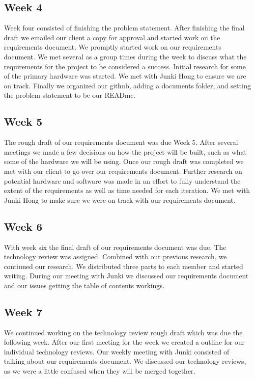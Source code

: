 \documentclass[onecolumn, draftclsnofoot,10pt, compsoc]{IEEEtran}
\begin{document}
		\subsection{Week 4}
		Week four consisted of finishing the problem statement. After finishing the final draft we emailed our client a copy for approval and started work on the requirements document.
		We promptly started work on our requirements document. We met several as a group times during the week to discuss what the requirements for the project  to be considered a success.
		Initial research for some of the primary hardware was started. We met with Junki Hong to ensure we are on track.
		Finally we organized our github, adding a documents folder, and setting the problem statement to be our READme.

		\subsection{Week 5}
		The rough draft of our requirements document was due Week 5. After several meetings we made a few decisions on how the project will be built, such as what some of the hardware we will be using.
		Once our rough draft was completed we met with our client to go over our requirements document.
		Further research on potential hardware and software was made in an effort to fully understand the extent of the requirements as well as time needed for each iteration.
		We met with Junki Hong to make sure we were on track with our requirements document.

		\subsection{Week 6}
		With week six the final draft of our requirements document was due. The technology review was assigned.
		Combined with our previous research, we continued our research. We distributed three parts to each member and started writing.
		During our meeting with Junki we discussed our requirements document and our issues getting the table of contents workings.

		\subsection{Week 7}
		We continued working on the technology review rough draft which was due the following week.
		After our first meeting for the week we created a outline for our individual technology reviews.
		Our weekly meeting with Junki consisted of talking about our requirements document.
		We discussed our technology reviews, as we were a little confused when they will be merged together.
\end{document}
